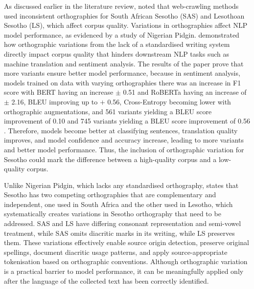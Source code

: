 \documentclass[12pt]{ThesisRU}
\begin{document}
As discussed earlier in the literature review, \citet{Sibeko2024} noted that web-crawling methods used inconsistent orthographies for South African Sesotho (SAS) and Lesothoan Sesotho (LS), which affect corpus quality. Variations in orthographies affect NLP model performance, as evidenced by a study of Nigerian Pidgin. \citet{lin-etal-2024-modeling} demonstrated how orthographic variations from the lack of a standardised writing system directly impact corpus quality that hinders downstream NLP tasks such as machine translation and sentiment analysis. The results of the paper prove that more variants ensure better model performance, because in sentiment analysis, models trained on data with varying orthographies there was an increase in F1 score with BERT having an increase  $\pm$ 0.51 and RoBERTa having an increase of $\pm$ 2.16, BLEU improving up to $+$ 0.56, Cross-Entropy becoming lower with orthographic augmentations, and 561 variants yielding a BLEU score improvement of  0.10 and 745 variants yielding a BLEU score improvement of 0.56 \citep{lin-etal-2024-modeling}. Therefore, models become better at classifying sentences, translation quality improves, and model confidence and accuracy increase, leading to more variants and better model performance. Thus, the inclusion of orthographic variation for Sesotho could mark the difference between a high-quality corpus and a low-quality corpus. 

Unlike Nigerian Pidgin, which lacks any standardised orthography, \citet{Makutoane2022} states that Sesotho has two competing orthographies that are complementary and independent, one used in South Africa and the other used in Lesotho, which systematically creates variations in Sesotho orthography that need to be addressed. SAS and LS have differing consonant representation and semi-vowel treatment, while SAS omits diacritic marks in its writing, while LS preserves them. These variations effectively enable source origin detection, preserve original spellings, document diacritic usage patterns, and apply source-appropriate tokenisation based on orthographic conventions. Although orthographic variation is a practical barrier to model performance, it can be meaningfully applied only after the language of the collected text has been correctly identified. 
\vspace{1em}
\end{document}
